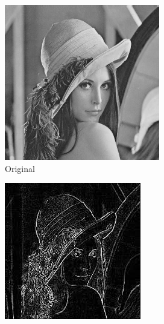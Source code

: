 \begin{figure}[H]
    \centering
    \begin{subfigure}[b]{0.3\textwidth}
    \includegraphics[width=\textwidth]{imgs/conv/lena.png}
    \caption{Original}
  \end{subfigure}
  \hfill
  \begin{subfigure}[b]{0.3\textwidth}
    \includegraphics[width=\textwidth]{imgs/conv/lena2.jpg}

\end{subfigure}
\end{figure}
